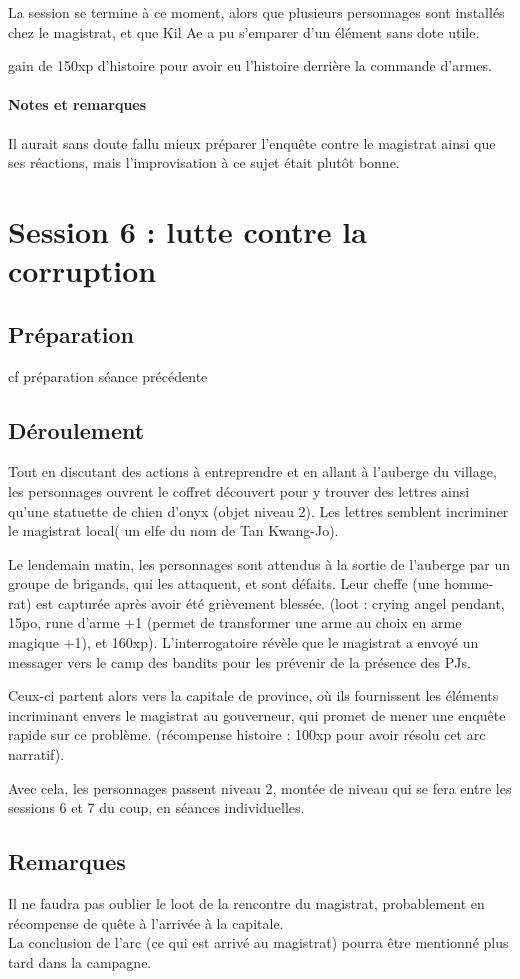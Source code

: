 \documentclass[10pt,a4paper]{book}
\begin{document}
La session se termine à ce moment, alors que plusieurs personnages sont installés chez le magistrat, et que Kil Ae a pu s'emparer d'un élément sans dote utile.

gain de 150xp d'histoire pour avoir eu l'histoire derrière la commande d'armes.
\paragraph{Notes et remarques}
Il aurait sans doute fallu mieux préparer l'enquête contre le magistrat ainsi que ses réactions, mais l'improvisation à ce sujet était plutôt bonne.
\section{Session 6 : lutte contre la corruption}
\subsection{Préparation} cf préparation séance précédente
\subsection{Déroulement}
Tout en discutant des actions à entreprendre et en allant à l'auberge du village, les personnages ouvrent le coffret découvert pour y trouver des lettres ainsi qu'une statuette de chien d'onyx (objet niveau 2). Les lettres semblent incriminer le magistrat local( un elfe du nom de Tan Kwang-Jo).

Le lendemain matin, les personnages sont attendus à la sortie de l'auberge par un groupe de brigands, qui les attaquent, et sont défaits. Leur cheffe (une homme-rat) est capturée après avoir été grièvement blessée. (loot : crying angel pendant, 15po, rune d'arme +1 (permet de transformer une arme au choix en arme magique +1), et 160xp). L'interrogatoire révèle que le magistrat a envoyé un messager vers le camp des bandits pour les prévenir de la présence des PJs.

Ceux-ci partent alors vers la capitale de province, où ils fournissent les éléments incriminant envers le magistrat au gouverneur, qui promet de mener une enquête rapide sur ce problème. (récompense histoire : 100xp pour avoir résolu cet arc narratif).

Avec cela, les personnages passent niveau 2, montée de niveau qui se fera entre les sessions 6 et 7 du coup, en séances individuelles.
\subsection{Remarques}
Il ne faudra pas oublier le loot de la rencontre du magistrat, probablement en récompense de quête à l'arrivée à la capitale.\\
La conclusion de l'arc (ce qui est arrivé au magistrat) pourra être mentionné plus tard dans la campagne.
\end{document}
